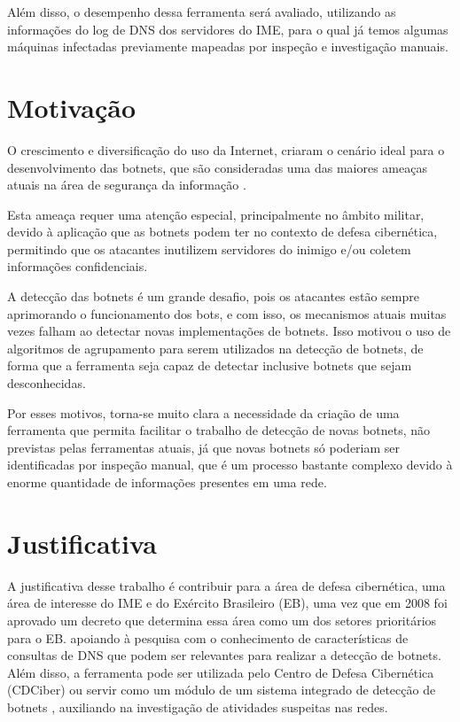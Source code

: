 Além disso, o desempenho dessa ferramenta será avaliado, utilizando as informações do log de DNS dos servidores do IME, para o qual já temos algumas máquinas infectadas previamente mapeadas por inspeção e investigação manuais.

\section{Motivação}
O crescimento e diversificação do uso da Internet, criaram o cenário ideal para o desenvolvimento das botnets, que são consideradas uma das maiores ameaças atuais na área de segurança da informação \citep{ji2008botnet}. 

Esta ameaça requer uma atenção especial, principalmente no âmbito militar, devido à aplicação que as botnets podem ter no contexto de defesa cibernética, permitindo que os atacantes inutilizem servidores do inimigo e/ou coletem informações confidenciais.

A detecção das botnets é um grande desafio, pois os atacantes estão sempre aprimorando o funcionamento dos bots, e com isso, os mecanismos atuais muitas vezes falham ao detectar novas implementações de botnets. Isso motivou o uso de algoritmos de agrupamento para serem utilizados na detecção de botnets, de forma que a ferramenta seja capaz de detectar inclusive botnets que sejam desconhecidas.

Por esses motivos, torna-se muito clara a necessidade da criação de uma ferramenta que permita facilitar o trabalho de detecção de novas botnets, não previstas pelas ferramentas atuais, já que novas botnets só poderiam ser identificadas por inspeção manual, que é um processo bastante complexo devido à enorme quantidade de informações presentes em uma rede.

\section{Justificativa}
A justificativa desse trabalho é contribuir para a área de defesa cibernética, uma área de interesse do IME e do Exército Brasileiro (EB), uma vez que em 2008 foi aprovado um decreto que determina essa área como um dos setores prioritários para o EB. apoiando à pesquisa com o conhecimento de características de consultas de DNS que podem ser relevantes para realizar a detecção de botnets. Além disso, a ferramenta pode ser utilizada pelo Centro de Defesa Cibernética (CDCiber) ou servir como um módulo de um sistema integrado de detecção de botnets \citep{silva2012arquitetura}, auxiliando na investigação de atividades suspeitas nas redes.

